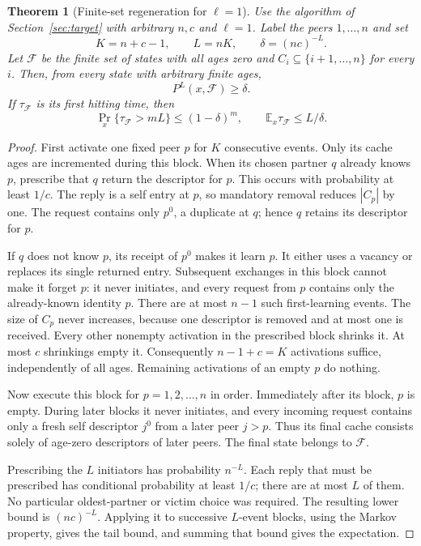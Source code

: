 \documentclass[11pt]{article}
\newtheorem{theorem}{Theorem}
\begin{document}
\begin{theorem}[Finite-set regeneration for $\ell=1$]
\label{thm:agereset}
Use the algorithm of Section~\ref{sec:target}
with arbitrary $n,c$ and $\ell=1$. Label the peers $1,\ldots,n$ and set
\[
 K=n+c-1,\qquad L=nK,\qquad \delta=(nc)^{-L}.
\]
Let $\mathcal F$ be the finite set of states with all ages zero and
$C_i\subseteq\{i+1,\ldots,n\}$ for every $i$. Then, from every state
with arbitrary finite ages,
\[
 P^L(x,\mathcal F)\ge\delta.
\]
If $\tau_{\mathcal F}$ is its first hitting time, then
\[
 \Pr_x\{\tau_{\mathcal F}>mL\}\le(1-\delta)^m,\qquad
 \mathbb E_x\tau_{\mathcal F}\le L/\delta .
\]
\end{theorem}
\begin{proof}
First activate one fixed peer $p$ for $K$ consecutive events.
Only its cache ages are incremented during this block. When its
chosen partner $q$ already knows $p$, prescribe that $q$ return the
descriptor for $p$. This occurs with probability at least $1/c$.
The reply is a self entry at $p$, so mandatory removal reduces
$|C_p|$ by one. The request contains only $p^0$, a duplicate at
$q$; hence $q$ retains its descriptor for $p$.

If $q$ does not know $p$, its receipt of $p^0$ makes it learn $p$.
It either uses a vacancy or replaces its single returned entry.
Subsequent exchanges in this block cannot make it forget $p$:
it never initiates, and every request from $p$ contains only the
already-known identity $p$. There are at most $n-1$ such first-learning
events. The size of $C_p$ never increases, because one descriptor is
removed and at most one is received. Every other nonempty activation
in the prescribed block shrinks it. At most $c$ shrinkings empty it.
Consequently $n-1+c=K$ activations suffice, independently of all ages.
Remaining activations of an empty $p$ do nothing.

Now execute this block for $p=1,2,\ldots,n$ in order. Immediately
after its block, $p$ is empty. During later blocks it never initiates,
and every incoming request contains only a fresh self descriptor
$j^0$ from a later peer $j>p$. Thus its final cache consists solely
of age-zero descriptors of later peers. The final state belongs
to $\mathcal F$.

Prescribing the $L$ initiators has probability $n^{-L}$. Each reply
that must be prescribed has conditional probability at least $1/c$;
there are at most $L$ of them. No particular oldest-partner or
victim choice was required. The resulting lower bound is
$(nc)^{-L}$. Applying it to successive $L$-event blocks, using the
Markov property, gives the tail bound, and summing that bound gives
the expectation.
\end{proof}
\end{document}
